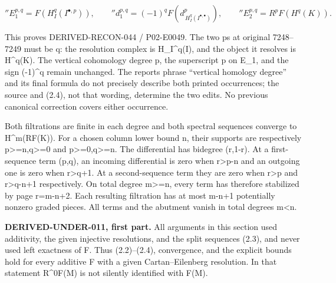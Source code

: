 \documentclass[11pt]{article}
\begin{document}
\[
 {}''E_1^{p,q}=F(H_I^q(I^{\bullet,p})),\qquad
 {}''d_1^{p,q}=(-1)^q F(d_{\,H_I^q(I^{\bullet,\bullet})}^{p}),
 \qquad
 {}''E_2^{p,q}=R^pF(H^q(K)).                                  \tag{2.4}
\]

This proves DERIVED-RECON-044 /\allowbreak{} P02-E0049. The two p\textquotesingle s at original 7248–\allowbreak{}7249 must be q:\allowbreak{} the resolution complex is H\_\allowbreak{}I\textasciicircum{}q(I)\allowbreak{},\allowbreak{} and the object it resolves is H\textasciicircum{}q(K)\allowbreak{}. The vertical cohomology degree p,\allowbreak{} the superscript p on E\_\allowbreak{}1,\allowbreak{} and the sign (-1)\allowbreak{}\textasciicircum{}q remain unchanged. The report\textquotesingle s phrase ``vertical homology degree'' and its final formula do not precisely describe both printed occurrences; the source and (2.4)\allowbreak{},\allowbreak{} not that wording,\allowbreak{} determine the two edits. No previous canonical correction covers either occurrence.

Both filtrations are finite in each degree and both spectral sequences converge to H\textasciicircum{}m(RF(K)\allowbreak{})\allowbreak{}. For a chosen column lower bound n,\allowbreak{} their supports are respectively p>\allowbreak{}=n,\allowbreak{}q>\allowbreak{}=0 and p>\allowbreak{}=0,\allowbreak{}q>\allowbreak{}=n. The differential has bidegree (r,\allowbreak{}1-r)\allowbreak{}. At a first-sequence term (p,\allowbreak{}q)\allowbreak{},\allowbreak{} an incoming differential is zero when r\textgreater p-n and an outgoing one is zero when r>q\allowbreak{}+1. At a second-sequence term they are zero when r\textgreater p and r>q-n\allowbreak{}+1 respectively. On total degree m>\allowbreak{}=n,\allowbreak{} every term has therefore stabilized by page r\allowbreak{}=m-n\allowbreak{}+2. Each resulting filtration has at most m-n\allowbreak{}+1 potentially nonzero graded pieces. All terms and the abutment vanish in total degrees m\textless n.

\textbf{DERIVED-UNDER-011,\allowbreak{} first part.} All arguments in this section used additivity,\allowbreak{} the given injective resolutions,\allowbreak{} and the split sequences (2.3)\allowbreak{},\allowbreak{} and never used left exactness of F. Thus (2.2)\allowbreak{}–\allowbreak{}(2.4)\allowbreak{},\allowbreak{} convergence,\allowbreak{} and the explicit bounds hold for every additive F with a given Cartan–\allowbreak{}Eilenberg resolution. In that statement R\textasciicircum{}0F(M)\allowbreak{} is not silently identified with F(M)\allowbreak{}.
\end{document}
